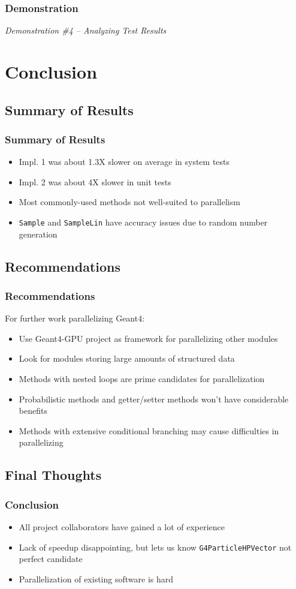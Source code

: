 \documentclass{beamer}
\begin{document}
\begin{frame}
\frametitle{Demonstration}
\begin{center}
\emph{Demonstration  \#4 -- Analyzing Test Results}
\end{center}
\end{frame}

\section{Conclusion}
\subsection{Summary of Results}
\begin{frame}
\frametitle{Summary of Results}
\begin{itemize}
\item Impl. 1 was about 1.3X slower on average in system tests
\item Impl. 2 was about 4X slower in unit tests
\item Most commonly-used methods not well-suited to parallelism
\item \texttt{Sample} and \texttt{SampleLin} have accuracy issues due to random number generation
\end{itemize}
\end{frame}

\subsection{Recommendations}
\frametitle{Recommendations}
\begin{frame}
For further work parallelizing Geant4:
\begin{itemize}
\item Use Geant4-GPU project as framework for parallelizing other modules
\item Look for modules storing large amounts of structured data
\item Methods with nested loops are prime candidates for parallelization
\item Probabilistic methods and getter/setter methods won't have considerable benefits
\item Methods with extensive conditional branching may cause difficulties in parallelizing
\end{itemize}
\end{frame}

\subsection{Final Thoughts}
\begin{frame}
\frametitle{Conclusion}
\begin{itemize}
\item All project collaborators have gained a lot of experience
\item Lack of speedup disappointing, but lets us know \texttt{G4ParticleHPVector} not perfect candidate
\item Parallelization of existing software is hard
\end{itemize}
\end{frame}
\end{document}
